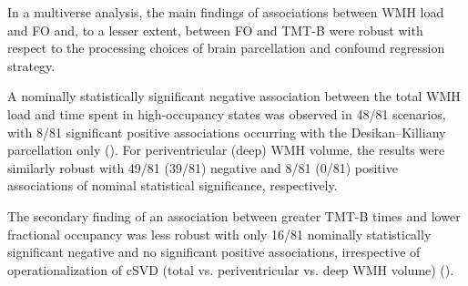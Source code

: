 In a multiverse analysis, the main findings of associations between WMH load and FO and, to a lesser extent, between FO and TMT-B were robust with respect to the processing choices of brain parcellation and confound regression strategy.

A nominally statistically significant negative association between the total WMH load and time spent in high-occupancy states was observed in 48/81 scenarios, with 8/81 significant positive associations occurring with the Desikan--Killiany parcellation only (). 
For periventricular (deep) WMH volume, the results were similarly robust with 49/81 (39/81) negative and 8/81 (0/81) positive associations of nominal statistical significance, respectively.

The secondary finding of an association between greater TMT-B times and lower fractional occupancy was less robust with only 16/81 nominally statistically significant negative and no significant positive associations, irrespective of operationalization of cSVD (total vs. periventricular vs. deep WMH volume) ().

